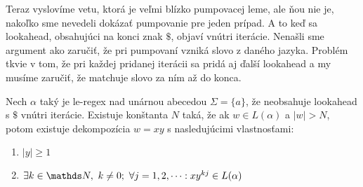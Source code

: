 Teraz vyslovíme vetu, ktorá je veľmi blízko pumpovacej leme, ale ňou nie je, nakoľko sme nevedeli dokázať pumpovanie pre jeden prípad. A to keď sa lookahead, obsahujúci na konci znak $\mathdollar$, objaví vnútri iterácie. Nenašli sme argument ako zaručiť, že pri pumpovaní vzniká slovo z daného jazyka. Problém tkvie v tom, že pri každej pridanej iterácii sa pridá aj ďalší lookahead a my musíme zaručiť, že matchuje slovo za ním až do konca.

\begin{veta}
Nech $\alpha$ taký je le-regex nad unárnou abecedou $\Sigma = \lbrace a \rbrace$, že neobsahuje lookahead s $\mathdollar$ vnútri iterácie.  Existuje konštanta $N$ taká, že ak $w \in L(\alpha)$ a $\vert w \vert > N$, potom existuje dekompozícia $w=xy$ s nasledujúcimi vlastnosťami:
\begin{enumerate}
\item $\vert y \vert \geq 1$
\item $\exists k \in \N,~k\neq 0;~\forall j = 1,2,\dots: xy^{kj} \in L(\alpha)$
\end{enumerate}
\end{veta}
